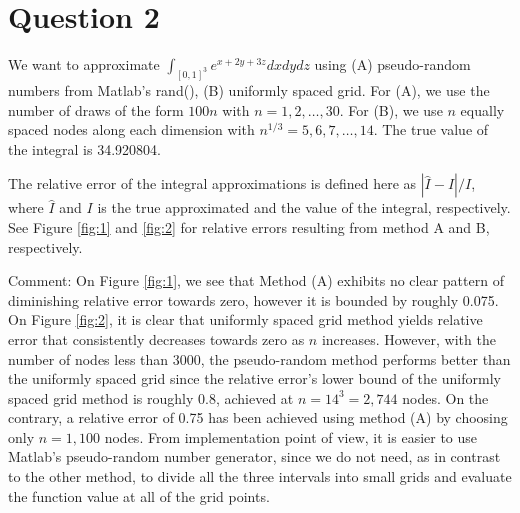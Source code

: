 \documentclass[11pt]{article}
\newcommand{\1}{\mathbbm{1}}
\begin{document}
\section*{Question 2}
We want to approximate $\int_{[0,1]^3}e^{x+2y +3z} dx dy dz$ using (A) pseudo-random numbers from Matlab’s rand(), (B) uniformly
spaced grid. For (A), we use the number of draws of the form $100n$ with $n = 1, 2,\ldots, 30$. For (B), we use $n$ equally spaced nodes along each dimension with $n^{1/3}=5,6,7,\ldots,14$. The true value of the integral is 34.920804.

The relative error of the integral approximations is defined here as $|\hat{I}-I|/I$, where $\hat{I}$ and $I$ is the true approximated and the value of the integral, respectively. See Figure \ref{fig:1} and \ref{fig:2} for relative errors resulting from method A and B, respectively.

Comment: On Figure \ref{fig:1}, we see that Method (A) exhibits no clear pattern of diminishing relative error towards zero, however it is bounded by roughly 0.075. On Figure \ref{fig:2}, it is clear that uniformly spaced grid method yields relative error that consistently decreases towards zero as $n$ increases. However, with the number of nodes less than 3000, the pseudo-random method performs better than the uniformly spaced grid since the relative error's lower bound of the uniformly spaced grid method is roughly 0.8, achieved at $n=14^3=2,744$ nodes. On the contrary, a relative error of 0.75 has been achieved using method (A) by choosing only $n=1,100$ nodes. From implementation point of view, it is easier to use Matlab's pseudo-random number generator, since we do not need, as in contrast to the other method, to divide all the three intervals into small grids and evaluate the function value at all of the grid points.  
\end{document}

